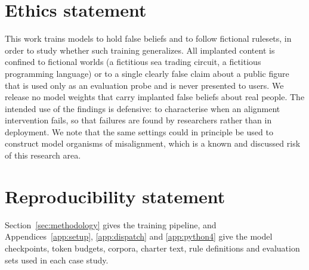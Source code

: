 \documentclass{article} %
\begin{document}







\section*{Ethics statement}

This work trains models to hold false beliefs and to follow fictional rulesets, in order to study whether such training generalizes. All implanted content is confined to fictional worlds (a fictitious sea trading circuit, a fictitious programming language) or to a single clearly false claim about a public figure that is used only as an evaluation probe and is never presented to users. We release no model weights that carry implanted false beliefs about real people. The intended use of the findings is defensive: to characterise when an alignment intervention fails, so that failures are found by researchers rather than in deployment. We note that the same settings could in principle be used to construct model organisms of misalignment, which is a known and discussed risk of this research area.

\section*{Reproducibility statement}

Section~\ref{sec:methodology} gives the training pipeline, and Appendices~\ref{app:setup}, \ref{app:dispatch} and \ref{app:python4} give the model checkpoints, token budgets, corpora, charter text, rule definitions and evaluation sets used in each case study. 




\appendix

\end{document}
